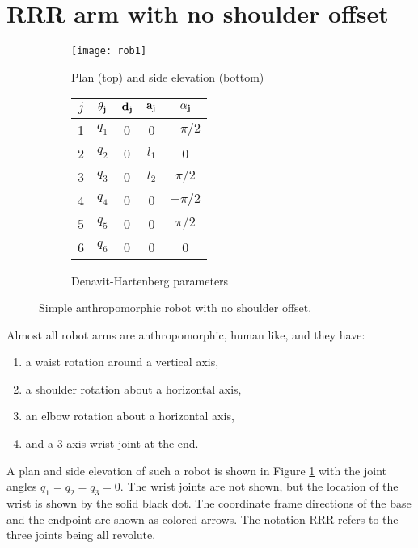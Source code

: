 \documentclass[11pt]{article}
\numberwithin{equation}{section}
\begin{document}
\tableofcontents
\pagebreak
\section{RRR arm with no shoulder offset}

	\begin{figure}[h]
	\centering
	\begin{subfigure}[b]{0.6\textwidth}
		\texttt{[image: rob1]}
		\caption{Plan (top) and side elevation (bottom)}
		\label{fig:rob1}
	\end{subfigure}
	\begin{subfigure}[b]{0.3\textwidth}
		\begin{tabular}{|c|c|c|c|c|} \hline
			$j$ & $\bf \theta_j$ & $\bf d_j$ & $\bf a_j$ & $\bf \alpha_j$ \\ \hline
			\rowcolor{SkyBlue}1 &  $q_1$ & \cellcolor{White} 0 &  0& $-\pi/2$ \\
			\rowcolor{SkyBlue}2 &  $q_2$ & 0& $l_1$& 0 \\
			\rowcolor{SkyBlue}3 & $q_3$ & 0 &$l_2$  & $\pi/2$ \\
			\rowcolor{Peach}4 &  $q_4$ & 0 & 0 & $-\pi/2$ \\
			\rowcolor{Peach}5&  $q_5$ & 0 & 0 & $\pi/2$ \\
			\cellcolor{Peach}6 &  \cellcolor{Peach} $q_6$ &0  &0  & 0 \\ \hline
		\end{tabular}
		\caption{Denavit-Hartenberg parameters}
		\label{fig:dh1}
	\end{subfigure}

	\caption{Simple anthropomorphic robot with no shoulder offset.  }
	\end{figure}

Almost all robot arms are anthropomorphic, human like, and they have:
\begin{enumerate}
\item a waist rotation around a vertical axis, 
\item a shoulder rotation about a horizontal axis, 
\item an elbow rotation about a horizontal axis,
\item and a 3-axis wrist joint at the end.
\end{enumerate}

A plan and side elevation of such a robot is shown in Figure \ref{fig:rob1} with the joint angles $q_1=q_2=q_3 =0$.
The wrist joints are not shown, but the location of the wrist is shown by the solid black dot.
The coordinate
frame directions of the base and the endpoint are shown as colored arrows.
The notation RRR refers to the three joints being all revolute.
\end{document}
